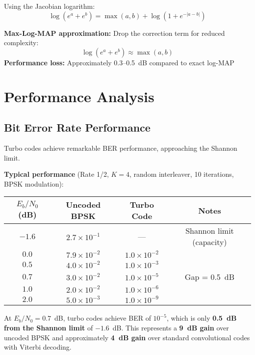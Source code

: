 Using the Jacobian logarithm:
\begin{equation}
\log(e^a + e^b) = \max(a, b) + \log(1 + e^{-|a-b|})
\label{eq:jacobian-log}
\end{equation}

\textbf{Max-Log-MAP approximation:} Drop the correction term for reduced complexity:
\begin{equation}
\log(e^a + e^b) \approx \max(a, b)
\end{equation}
\textbf{Performance loss:} Approximately 0.3--0.5~dB compared to exact log-MAP

\section{Performance Analysis}

\subsection{Bit Error Rate Performance}

Turbo codes achieve remarkable BER performance, approaching the Shannon limit.

\textbf{Typical performance} (Rate 1/2, $K=4$, random interleaver, 10 iterations, BPSK modulation):

\begin{center}
\begin{tabular}{@{}cccc@{}}
\toprule
$E_b/N_0$ (dB) & Uncoded BPSK & Turbo Code & Notes \\
\midrule
$-1.6$ & $2.7 \times 10^{-1}$ & --- & Shannon limit (capacity) \\
$0.0$ & $7.9 \times 10^{-2}$ & $1.0 \times 10^{-2}$ & \\
$0.5$ & $4.0 \times 10^{-2}$ & $1.0 \times 10^{-3}$ & \\
$0.7$ & $3.0 \times 10^{-2}$ & $1.0 \times 10^{-5}$ & Gap = 0.5~dB \\
$1.0$ & $2.0 \times 10^{-2}$ & $1.0 \times 10^{-6}$ & \\
$2.0$ & $5.0 \times 10^{-3}$ & $1.0 \times 10^{-9}$ & \\
\bottomrule
\end{tabular}
\end{center}

\begin{keyconcept}
At $E_b/N_0 = 0.7$~dB, turbo codes achieve BER of $10^{-5}$, which is only \textbf{0.5~dB from the Shannon limit} of $-1.6$~dB. This represents a \textbf{9~dB gain} over uncoded BPSK and approximately \textbf{4~dB gain} over standard convolutional codes with Viterbi decoding.
\end{keyconcept}

